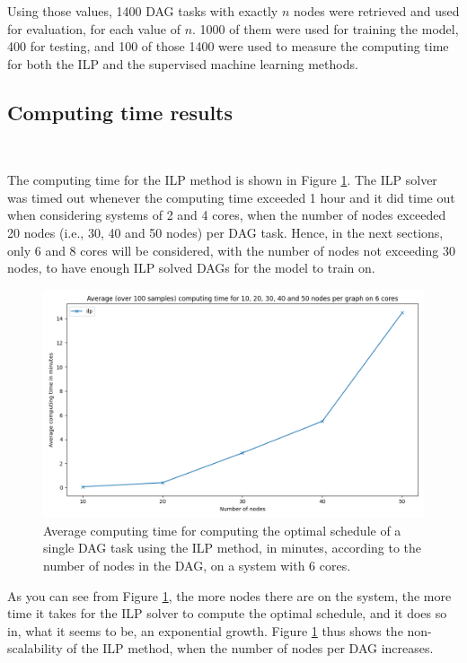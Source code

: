 Using those values, 1400 DAG tasks with exactly $n$ nodes were retrieved and used for 
evaluation, for each value of $n$.
1000 of them were used for training the model, 400 for testing,
and 100 of those 1400 were used to measure the computing time 
for both the ILP and the supervised machine learning methods.


\subsection{Computing time results}
~

The computing time for the ILP method is shown 
in Figure \ref{fig:ilp_compute_time}.
The ILP solver was timed out whenever the computing time exceeded 1 hour
and it did time out when considering systems of 2 and 4 cores, when the number of nodes
exceeded 20 nodes (i.e., 30, 40 and 50 nodes) per DAG task.
Hence, in the next sections, only 6 and 8 cores will be considered,
with the number of nodes not exceeding 30 nodes, to have enough
ILP solved DAGs for the model to train on. 

\begin{figure}
    \centering
    \includegraphics[width=\linewidth]{images/result_computing_time_ilp_m6.png}
    \caption{Average computing time for computing the optimal schedule
    of a single DAG task using the ILP method, in minutes, according to 
    the number of nodes in the DAG, on a system with 6 cores.}
    \label{fig:ilp_compute_time}
\end{figure}

As you can see from Figure \ref{fig:ilp_compute_time}, the more nodes there are on the system, 
the more time it takes for the ILP solver to compute the optimal schedule,
and it does so in, what it seems to be, an exponential growth.
Figure \ref{fig:ilp_compute_time} thus shows the non-scalability
of the ILP method, when the number of nodes per DAG increases.

